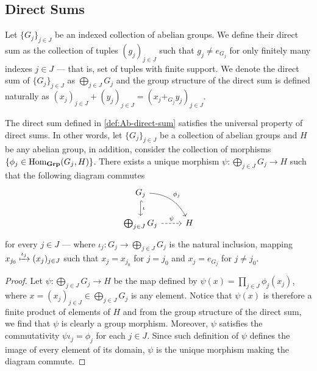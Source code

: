 \subsection{Direct Sums}

\begin{definition}
\label{def:Ab-direct-sum}
Let \(\{G_j\}_{j \in J}\) be an indexed collection of abelian groups. We define
their direct sum as the collection of tuples \((g_j)_{j \in J}\) such that \(g_j
\neq e_{G_j}\) for only finitely many indexes \(j \in J\) --- that is, set of
tuples with finite support. We denote the direct sum of \(\{G_{j}\}_{j \in J}\)
as \(\bigoplus_{j \in J} G_j\) and the group structure of the direct sum is
defined naturally as \((x_j)_{j \in J} + (y_j)_{j \in J} = (x_j +_{G_{j}}
y_j)_{j \in J}\).
\end{definition}

\begin{proposition}
\label{prop:Ab-direct-sum-universal-property}
The direct sum defined in \cref{def:Ab-direct-sum} satisfies the universal
property of direct sums. In other words, let \(\{G_{j}\}_{j \in J}\) be a
collection of abelian groups and \(H\) be any abelian group, in addition,
consider the collection of morphisms \(\{\phi_j \in \operatorname{Hom}_{{\textbf{Grp}}}(G_j,
H)\}\). There exists a unique morphism \(\psi: \bigoplus_{j \in J} G_j \to H\)
such that the following diagram commutes
\[
  \begin{tikzcd}
    G_j \ar[rd, bend left, "\phi_j"] \ar[d, hook, "\iota"] &\\
    \bigoplus_{j \in J} G_j \ar[r, dashed, "\psi"] &H
  \end{tikzcd}
\]
for every \(j \in J\) --- where \(\iota_{j}: G_j \to \bigoplus_{j \in J} G_j\)
is the natural inclusion, mapping \(x_{j_0} \xmapsto{\iota_{j}} (x_j)_{j \in
J}\) such that \(x_j = x_{j_0}\) for \(j = j_0\) and \(x_j = e_{G_j}\) for \(j
\neq j_0\).
\end{proposition}

\begin{proof}
Let \(\psi: \bigoplus_{j \in J} G_j \to H\) be the map defined by \(\psi(x) =
\prod_{j \in J} \phi_{j}(x_j)\), where \(x = (x_j)_{j \in J} \in \bigoplus_{j
\in J} G_j\) is any element. Notice that \(\psi(x)\) is therefore a finite
product of elements of \(H\) and from the group structure of the direct sum, we
find that \(\psi\) is clearly a group morphism. Moreover, \(\psi\) satisfies the
commutativity \(\psi \iota_j = \phi_j\) for each \(j \in J\). Since such
definition of \(\psi\) defines the image of every element of its domain,
\(\psi\) is the unique morphism making the diagram commute.
\end{proof}

